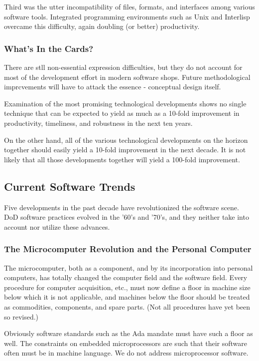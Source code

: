 \documentclass[12pt]{article}
\begin{document}
Third was the utter incompatibility of files, formats, and interfaces among
various software tools. Integrated programming environments such as Unix and
Interlisp overcame this difficulty, again doubling (or better) productivity.

\subsubsection*{What's In the Cards?}

There are stll non-essential expression difficulties, but they do not account
for most of the development effort in modern software shops. Future
methodological imprcvements will have to attack the essence - conceptual design
itself.

Examination of the most promising technological developments shows no single
technique that can be expected to yield as much as a 10-fold improvement in
productivity, timeliness, and robustness in the next ten years.

On the other hand, all of the various technological developments on the horizon
together should easily yield a 10-fold improvement in the next decade. It is
not likely that all those developments together will yield a 100-fold
improvement.

\subsection{Current Software Trends}

Five developments in the past decade have revolutionized the software scene.
DoD software practices evolved in the '60's and '70's, and they neither take
into account nor utilize these advances.

\subsubsection*{The Microcomputer Revolution and the Personal Computer}

The microcomputer, both as a component, and by its incorporation into personal
computers, has totally changed the computer field and the software field. Every
procedure for computer acquisition, etc., must now define a floor in machine
size below which it is not applicable, and machines below the floor should be
treated as commodities, components, and spare parts. (Not all procedures have
yet been so revised.)

Obviously software standards such as the Ada mandate must have such a floor as
well. The constraints on embedded microprocessors are such that their
software often must be in machine language. We do not address microprocessor
software.
\end{document}
